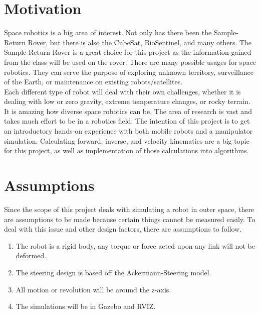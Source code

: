 \chapter{Motivation}
Space robotics is a big area of interest. Not only has there been the Sample-Return Rover, but there is also the CubeSat, BioSentinel, and many others. The Sample-Return Rover is a great choice for this project as the information gained from the class will be used on the rover. There are many possible usages for space robotics. They can serve the purpose of exploring unknown territory, surveillance of the Earth, or maintenance on existing robots/satellites.  \\

Each different type of robot will deal with their own challenges, whether it is dealing with low or zero gravity, extreme temperature changes, or rocky terrain. It is amazing how diverse space robotics can be. The area of research is vast and takes much effort to be in a robotics field. The intention of this project is to get an introductory hands-on experience with both mobile robots and a manipulator simulation. Calculating forward, inverse, and velocity kinematics are a big topic for this project, as well as implementation of those calculations into algorithms. 



\chapter{Assumptions}
Since the scope of this project deals with simulating a robot in outer space, there are assumptions to be made because certain things cannot be measured easily. To deal with this issue and other design factors, there are assumptions to follow. 

\begin{enumerate}
	\item The robot is a rigid body, any torque or force acted upon any link will not be deformed.
	\item The steering design is based off the Ackermann-Steering model.
	\item All motion or revolution will be around the z-axis.
	\item The simulations will be in Gazebo and RVIZ. 
\end{enumerate}